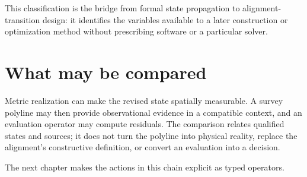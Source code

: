 This classification is the bridge from formal state propagation to
alignment-transition design: it identifies the variables available to a
later construction or optimization method without prescribing software
or a particular solver.

\section{What may be compared}

Metric realization can make the revised state spatially measurable. A
survey polyline may then provide observational evidence in a compatible
context, and an evaluation operator may compute residuals. The
comparison relates qualified states and sources; it does not turn the
polyline into physical reality, replace the alignment's constructive
definition, or convert an evaluation into a decision.

The next chapter makes the actions in this chain explicit as typed
operators.
